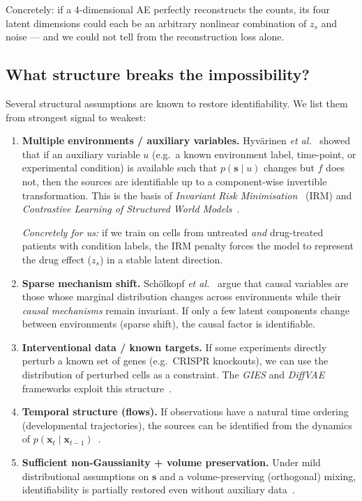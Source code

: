 \documentclass[11pt,a4paper]{article}
\theoremstyle{definition}
\begin{document}
\noindent Concretely: if a 4-dimensional AE perfectly reconstructs the
counts, its four latent dimensions could each be an arbitrary nonlinear
combination of $z_s$ and noise --- and we could not tell from the
reconstruction loss alone.

\subsection{What structure breaks the impossibility?}

Several structural assumptions are known to restore identifiability.
We list them from strongest signal to weakest:

\begin{enumerate}

\item \textbf{Multiple environments / auxiliary variables.}
  Hyv\"arinen \emph{et al.}~\cite{hyvarinen2019nonlinear} showed that
  if an auxiliary variable $u$ (e.g.\ a known environment label,
  time-point, or experimental condition) is available such that $p(\bm{s}
  \mid u)$ changes but $f$ does not, then the sources are identifiable
  up to a component-wise invertible transformation.  This is the basis
  of \emph{Invariant Risk Minimisation}~\cite{arjovsky2019irm} (IRM)
  and \emph{Contrastive Learning of Structured World
  Models}~\cite{scholkopf2021toward}.

  \emph{Concretely for us:} if we train on cells from untreated
  \emph{and} drug-treated patients with condition labels, the IRM
  penalty forces the model to represent the drug effect ($z_s$) in a
  stable latent direction.

\item \textbf{Sparse mechanism shift.}
  Sch\"olkopf \emph{et al.}~\cite{scholkopf2021toward} argue that
  causal variables are those whose marginal distribution changes across
  environments while their \emph{causal mechanisms} remain invariant.
  If only a few latent components change between environments (sparse
  shift), the causal factor is identifiable.

\item \textbf{Interventional data / known targets.}
  If some experiments directly perturb a known set of genes (e.g.\
  CRISPR knockouts), we can use the distribution of perturbed cells as
  a constraint.  The \emph{GIES} and \emph{DiffVAE} frameworks exploit
  this structure~\cite{scholkopf2021toward}.

\item \textbf{Temporal structure (flows).}
  If observations have a natural time ordering (developmental
  trajectories), the sources can be identified from the dynamics of
  $p(\bm{x}_t \mid \bm{x}_{t-1})$~\cite{hyvarinen2019nonlinear}.

\item \textbf{Sufficient non-Gaussianity + volume preservation.}
  Under mild distributional assumptions on $\bm{s}$ and a volume-preserving
  (orthogonal) mixing, identifiability is partially restored even without
  auxiliary data~\cite{halva2021disentanglement}.

\end{enumerate}
\end{document}
